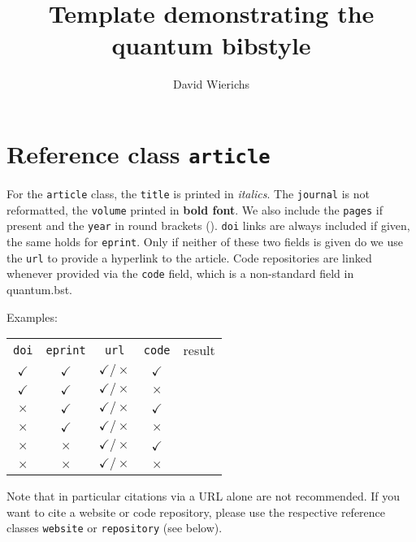 \documentclass[a4paper,twocolumn,11pt]{quantumarticle}
\begin{document}
	\title{Template demonstrating the quantum bibstyle}
	
	\author{David Wierichs}
	
	\maketitle
	
	\onecolumn
	\section{Reference class \texttt{article}}
	For the \texttt{article} class, the \texttt{title} is printed in \emph{italics}. The \texttt{journal} is not reformatted, the \texttt{volume} printed in \textbf{bold font}. We also include the \texttt{pages} if present and the \texttt{year} in round brackets ().
	\texttt{doi} links are always included if given, the same holds for \texttt{eprint}. Only if neither of these two fields is given do we use the \texttt{url} to provide a hyperlink to the article.
	Code repositories are linked whenever provided via the \texttt{code} field, which is a non-standard field in 
	quantum.bst. 
	
	Examples:
	
	\begin{tabular}{ccccc}
		\texttt{doi}& \texttt{eprint} & \texttt{url} & \texttt{code} & result \\
		$\checkmark$ & $\checkmark$ & $\checkmark\big / \times$ & $\checkmark$ & \citearticle{article_doi_eprint_url_code} \\
		$\checkmark$ & $\checkmark$ & $\checkmark\big / \times$ & $\times$ & \citearticle{article_doi_eprint_url} \\
		$\times$ & $\checkmark$ & $\checkmark\big / \times$ & $\checkmark$ & \citearticle{article_eprint_url_code} \\
		$\times$ & $\checkmark$ & $\checkmark\big / \times$ & $\times$ & \citearticle{article_eprint_url} \\
		$\times$ & $\times$ & $\checkmark\big / \times$ & $\checkmark$ & \citearticle{article_url_code} \\
		$\times$ & $\times$ & $\checkmark\big / \times$ & $\times$ & \citearticle{article_url} \\
	\end{tabular}
	
	Note that in particular citations via a URL alone are not recommended. If you want to cite a website or code repository, please use the respective reference classes \texttt{website} or \texttt{repository} (see below).
	
\end{document}
